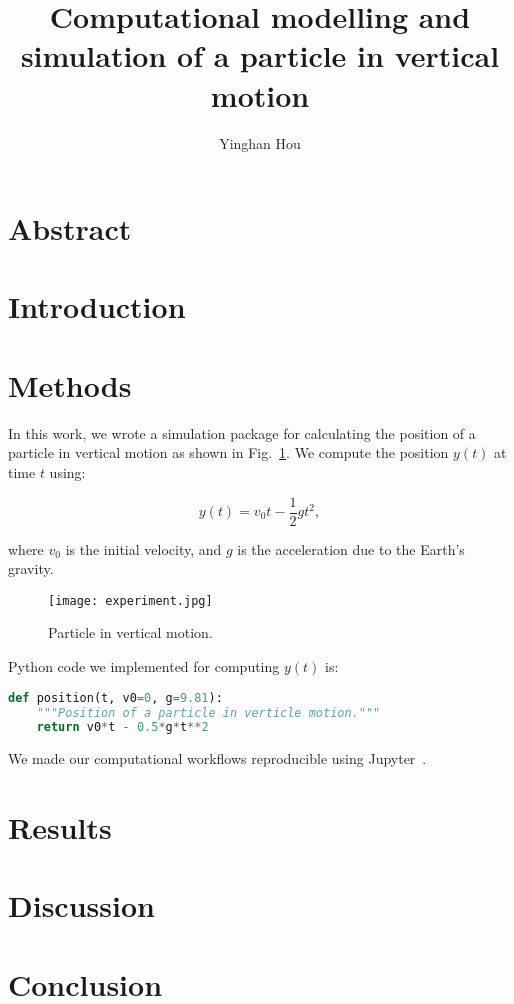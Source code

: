 \documentclass[project-plan]{report-template}
\title{Computational modelling and simulation of a particle in vertical motion}
\author{Yinghan Hou}
\begin{document}
\maketitlepage  %

\section*{Abstract}
\blindtext  %

\section{Introduction}
\blindtext[3]

\section{Methods}
In this work, we wrote a simulation package for calculating the position of a particle in vertical motion as shown in Fig.~\ref{fig:experiment}. We compute the position $y(t)$ at time $t$ using:

\begin{equation}
    \label{eq:vertical-position}
    y(t) = v_{0}t - \frac{1}{2}gt^{2},
\end{equation}

where $v_{0}$ is the initial velocity, and $g$ is the acceleration due to the Earth's gravity.

\begin{figure}
    \begin{center}
        \texttt{[image: experiment.jpg]}
    \end{center}
    \caption{\label{fig:experiment} Particle in vertical motion.}
\end{figure}

Python code we implemented for computing $y(t)$ is:

\begin{lstlisting}[language=Python]
def position(t, v0=0, g=9.81):
    """Position of a particle in verticle motion."""
    return v0*t - 0.5*g*t**2
\end{lstlisting}

We made our computational workflows reproducible using Jupyter~\cite{Beg2021}.

\section{Results}
\blindtext[3]

\section{Discussion}
\blindtext[4]

\section{Conclusion}
\blindtext[2]


\end{document}
